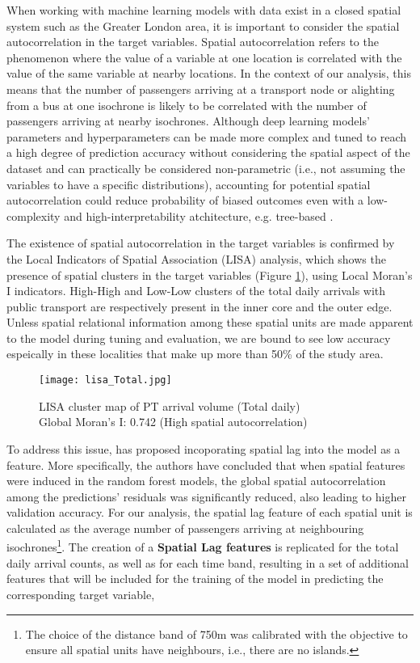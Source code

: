 When working with machine learning models with data exist in a closed spatial system such as the Greater London area, it is important to consider the spatial autocorrelation in the target variables. Spatial autocorrelation refers to the phenomenon where the value of a variable at one location is correlated with the value of the same variable at nearby locations. In the context of our analysis, this means that the number of passengers arriving at a transport node or alighting from a bus at one isochrone is likely to be correlated with the number of passengers arriving at nearby isochrones. Although deep learning models' parameters and hyperparameters can be made more complex and tuned to reach a high degree of prediction accuracy without considering the spatial aspect of the dataset and can practically be considered non-parametric (i.e., not assuming the variables to have a specific distributions), accounting for potential spatial autocorrelation could reduce probability of biased outcomes even with a low-complexity and high-interpretability atchitecture, e.g. tree-based \citep{meyerImportanceSpatialPredictor2019}.

The existence of spatial autocorrelation in the target variables is confirmed by the Local Indicators of Spatial Association (LISA) analysis, which shows the presence of spatial clusters in the target variables (Figure \ref{fig:lisacluster}), using Local Moran's I indicators. High-High and Low-Low clusters of the total daily arrivals with public transport are respectively present in the inner core and the outer edge. Unless spatial relational information among these spatial units are made apparent to the model during tuning and evaluation, we are bound to see low accuracy espeically in these localities that make up more than 50\% of the study area.  

\begin{figure}[ht]
    \centering
    \texttt{[image: lisa\_Total.jpg]}
    \captionsetup{justification=centering}
    \caption{LISA cluster map of PT arrival volume (Total daily)\\Global Moran's I: 0.742 (High spatial autocorrelation)}
    \label{fig:lisacluster}
\end{figure}

To address this issue, \citet{liuIncorporatingSpatialAutocorrelation2022} has proposed incoporating spatial lag into the model as a feature. More specifically, the authors have concluded that when spatial features were induced in the random forest models, the global spatial autocorrelation among the predictions' residuals was significantly reduced, also leading to higher validation accuracy. For our analysis, the spatial lag feature of each spatial unit is calculated as the average number of passengers arriving at neighbouring isochrones\footnote{The choice of the distance band of 750m was calibrated with the objective to ensure all spatial units have neighbours, i.e., there are no islands.}. The creation of a \textbf{Spatial Lag features} is replicated for the total daily arrival counts, as well as for each time band, resulting in a set of additional features that will be included for the training of the model in predicting the corresponding target variable,

